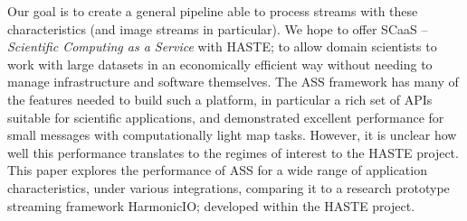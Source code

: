 \documentclass[conference]{IEEEtran}
\begin{document}
Our goal is to create a general pipeline able to process streams with these characteristics (and image streams in particular).
We hope to offer SCaaS -- \emph{Scientific Computing as a Service} with HASTE; to allow domain scientists to work with large datasets in an economically efficient way
without needing to manage infrastructure and software themselves. The ASS framework has many of the features needed to build such a platform, in particular a rich set of APIs suitable for scientific applications, and demonstrated excellent performance for small messages with computationally light map tasks. However, it is unclear how well this performance translates to the regimes of interest to the HASTE project. This paper explores the performance of ASS for a wide range of application characteristics, under various integrations, comparing it to a research prototype streaming framework HarmonicIO; developed within the HASTE project. 


\end{document}
